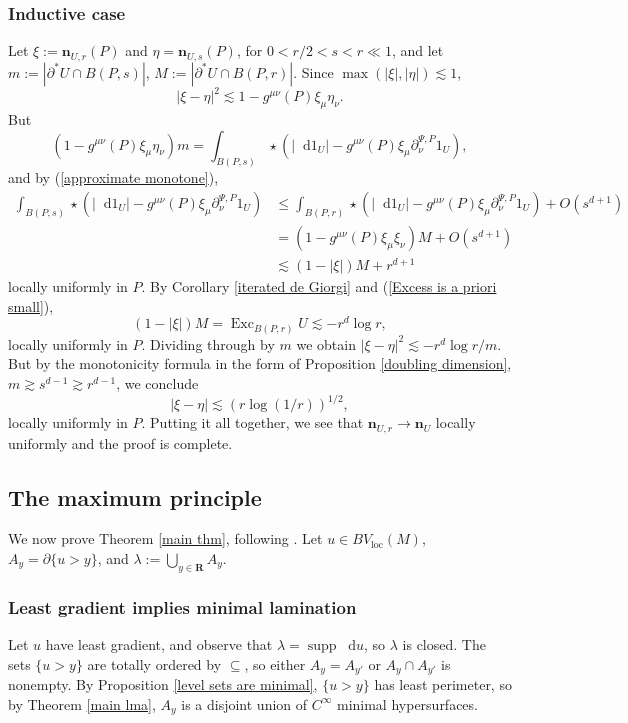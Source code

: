\documentclass[reqno,10pt]{amsart}
\newcommand{\RR}{\mathbf{R}}
\DeclareMathOperator{\Exc}{Exc}
\DeclareMathOperator{\supp}{supp}
\newcommand*\dif{\mathop{}\!\mathrm{d}}
\newcommand{\normal}{\mathbf n}
\newcommand{\loc}{\mathrm{loc}}
\theoremstyle{definition}
\numberwithin{equation}{section}
\begin{document}
\subsubsection{Inductive case}
Let $\xi := \normal_{U, r}(P)$ and $\eta = \normal_{U, s}(P)$, for $0 < r/2 < s < r \ll 1$, and let $m := |\partial^* U \cap B(P, s)|$, $M := |\partial^* U \cap B(P, r)|$.
Since $\max(|\xi|, |\eta|) \lesssim 1$, 
$$|\xi - \eta|^2 \lesssim 1 - g^{\mu\nu}(P) \xi_\mu \eta_\nu.$$
But
$$(1 - g^{\mu\nu}(P) \xi_\mu \eta_\nu)m = \int_{B(P, s)} \star (|\dif 1_U| - g^{\mu\nu}(P) \xi_\mu \partial_\nu^{\Psi, P} 1_U),$$
and by (\ref{approximate monotone}),
\begin{align*}
\int_{B(P, s)} \star (|\dif 1_U| - g^{\mu\nu}(P) \xi_\mu \partial_\nu^{\Psi, P} 1_U) 
&\leq \int_{B(P, r)} \star (|\dif 1_U| - g^{\mu\nu}(P) \xi_\mu \partial_\nu^{\Psi, P} 1_U) + O(s^{d + 1}) \\
&= (1 - g^{\mu\nu}(P) \xi_\mu \xi_\nu)M + O(s^{d + 1}) \\
&\lesssim (1 - |\xi|)M + r^{d + 1}
\end{align*}
locally uniformly in $P$.
By Corollary \ref{iterated de Giorgi} and (\ref{Excess is a priori small}),
$$(1 - |\xi|)M = \Exc_{B(P, r)} U \lesssim -r^d \log r,$$
locally uniformly in $P$. Dividing through by $m$ we obtain $|\xi - \eta|^2 \lesssim -r^d \log r/m$.
But by the monotonicity formula in the form of Proposition \ref{doubling dimension}, $m \gtrsim s^{d - 1} \gtrsim r^{d - 1}$, we conclude 
\begin{equation}\label{LC Cauchy}
|\xi - \eta| \lesssim (r \log (1/r))^{1/2},
\end{equation}
locally uniformly in $P$.
Putting it all together, we see that $\normal_{U, r} \to \normal_U$ locally uniformly and the proof is complete.






\subsection{The maximum principle}\label{Max Princip}
We now prove Theorem \ref{main thm}, following \cite[\S3]{górny2017planar}. Let $u \in BV_\loc(M)$, $A_y = \partial \{u > y\}$, and $\lambda := \bigcup_{y \in \RR} A_y$.

\subsubsection{Least gradient implies minimal lamination}
Let $u$ have least gradient, and observe that $\lambda = \supp \dif u$, so $\lambda$ is closed.
The sets $\{u > y\}$ are totally ordered by $\subseteq$, so either $A_y = A_{y'}$ or $A_y \cap A_{y'}$ is nonempty.
By Proposition \ref{level sets are minimal}, $\{u > y\}$ has least perimeter, so by Theorem \ref{main lma}, $A_y$ is a disjoint union of $C^\infty$ minimal hypersurfaces.
\end{document}
